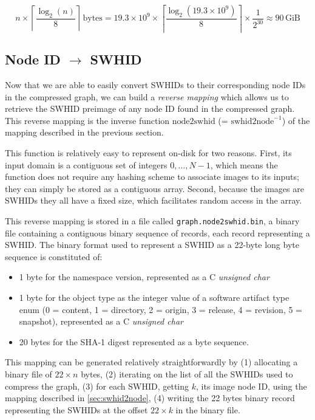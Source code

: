 \[
    n \times \left\lceil{\frac{\log_2(n)}{8}}\right\rceil\,\mathrm{bytes}
    = 19.3 \times 10^9 \times
        \left\lceil{\frac{\log_2(19.3 \times 10^9)}{8}}\right\rceil
        \times \frac{1}{2^{30}}
    \approx 90\,\mathrm{GiB}
\]

\subsection{Node ID $\to$ SWHID}%
\label{sec:node2swhid}

Now that we are able to easily convert \glspl{SWHID} to their corresponding
node IDs in the compressed graph, we can build a \emph{reverse mapping} which
allows us to retrieve the \gls{SWHID} preimage of any node ID found in the
compressed graph. This reverse mapping is the inverse function
$\mathrm{node2swhid}$ (= $\mathrm{swhid2node}^{-1}$) of the mapping
described in the previous section.

This function is relatively easy to represent on-disk for two reasons. First,
its input domain is a contiguous set of integers ${0,\ldots,N-1}$, which means
the function does not require any hashing scheme to associate images to its
inputs; they can simply be stored as a contiguous array. Second, because the
images are \glspl{SWHID} they all have a fixed size, which facilitates random
access in the array.

This reverse mapping is stored in a file called \texttt{graph.node2swhid.bin},
a binary file containing a contiguous binary sequence of records, each record
representing a \gls{SWHID}. The binary format used to represent a \gls{SWHID}
as a 22-byte long byte sequence is constituted of:

\begin{itemize}
    \item 1 byte for the namespace version, represented as a C \emph{unsigned
        char}
    \item 1 byte for the object type as the integer value of a software
        artifact type enum (0 = content, 1 = directory, 2 = origin, 3 =
        release, 4 = revision, 5 = snapshot), represented as a C \emph{unsigned
        char}
    \item 20 bytes for the SHA-1 digest represented as a byte sequence.
\end{itemize}

This mapping can be generated relatively straightforwardly by (1) allocating a
binary file of $22 \times n$ bytes, (2) iterating on the list of all the
\glspl{SWHID} used to compress the graph, (3) for each \gls{SWHID}, getting
$k$, its image node ID, using the mapping described in \cref{sec:swhid2node},
(4) writing the 22 bytes binary record representing the \glspl{SWHID} at the
offset $22 \times k$ in the binary file.

